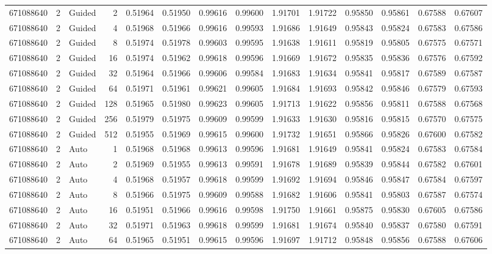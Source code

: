 \begin{tabular}{rrlrrrrrrrrrrr}
671088640 & 2 & Guided & 2 & 0.51964 & 0.51950 & 0.99616 & 0.99600 & 1.91701 & 1.91722 & 0.95850 & 0.95861 & 0.67588 & 0.67607 \\
671088640 & 2 & Guided & 4 & 0.51968 & 0.51966 & 0.99616 & 0.99593 & 1.91686 & 1.91649 & 0.95843 & 0.95824 & 0.67583 & 0.67586 \\
671088640 & 2 & Guided & 8 & 0.51974 & 0.51978 & 0.99603 & 0.99595 & 1.91638 & 1.91611 & 0.95819 & 0.95805 & 0.67575 & 0.67571 \\
671088640 & 2 & Guided & 16 & 0.51974 & 0.51962 & 0.99618 & 0.99596 & 1.91669 & 1.91672 & 0.95835 & 0.95836 & 0.67576 & 0.67592 \\
671088640 & 2 & Guided & 32 & 0.51964 & 0.51966 & 0.99606 & 0.99584 & 1.91683 & 1.91634 & 0.95841 & 0.95817 & 0.67589 & 0.67587 \\
671088640 & 2 & Guided & 64 & 0.51971 & 0.51961 & 0.99621 & 0.99605 & 1.91684 & 1.91693 & 0.95842 & 0.95846 & 0.67579 & 0.67593 \\
671088640 & 2 & Guided & 128 & 0.51965 & 0.51980 & 0.99623 & 0.99605 & 1.91713 & 1.91622 & 0.95856 & 0.95811 & 0.67588 & 0.67568 \\
671088640 & 2 & Guided & 256 & 0.51979 & 0.51975 & 0.99609 & 0.99599 & 1.91633 & 1.91630 & 0.95816 & 0.95815 & 0.67570 & 0.67575 \\
671088640 & 2 & Guided & 512 & 0.51955 & 0.51969 & 0.99615 & 0.99600 & 1.91732 & 1.91651 & 0.95866 & 0.95826 & 0.67600 & 0.67582 \\
671088640 & 2 & Auto & 1 & 0.51968 & 0.51968 & 0.99613 & 0.99596 & 1.91681 & 1.91649 & 0.95841 & 0.95824 & 0.67583 & 0.67584 \\
671088640 & 2 & Auto & 2 & 0.51969 & 0.51955 & 0.99613 & 0.99591 & 1.91678 & 1.91689 & 0.95839 & 0.95844 & 0.67582 & 0.67601 \\
671088640 & 2 & Auto & 4 & 0.51968 & 0.51957 & 0.99618 & 0.99599 & 1.91692 & 1.91694 & 0.95846 & 0.95847 & 0.67584 & 0.67597 \\
671088640 & 2 & Auto & 8 & 0.51966 & 0.51975 & 0.99609 & 0.99588 & 1.91682 & 1.91606 & 0.95841 & 0.95803 & 0.67587 & 0.67574 \\
671088640 & 2 & Auto & 16 & 0.51951 & 0.51966 & 0.99616 & 0.99598 & 1.91750 & 1.91661 & 0.95875 & 0.95830 & 0.67605 & 0.67586 \\
671088640 & 2 & Auto & 32 & 0.51971 & 0.51963 & 0.99618 & 0.99599 & 1.91681 & 1.91674 & 0.95840 & 0.95837 & 0.67580 & 0.67591 \\
671088640 & 2 & Auto & 64 & 0.51965 & 0.51951 & 0.99615 & 0.99596 & 1.91697 & 1.91712 & 0.95848 & 0.95856 & 0.67588 & 0.67606 \\

\end{tabular}

